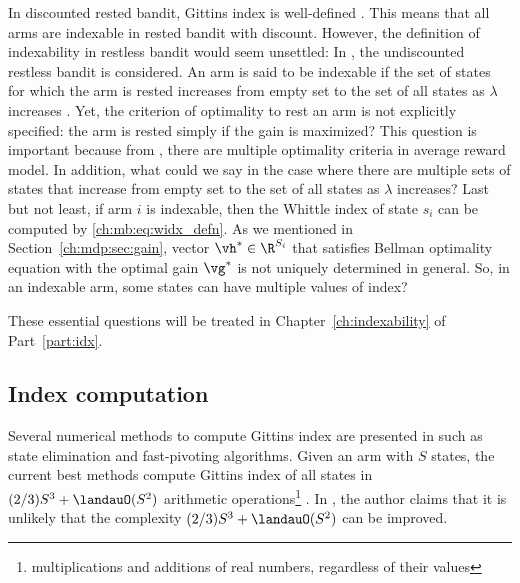 In discounted rested bandit, Gittins index is well-defined \cite{chakravorty2014multi}.
This means that all arms are indexable in rested bandit with discount.
However, the definition of indexability in restless bandit would seem unsettled:
In \cite[Chapter~14]{whittle1996optimal}, the undiscounted restless bandit is considered.
An arm is said to be indexable if the set of states for which the arm is rested increases from empty set to the set of all states as $\lambda$ increases \cite[Page~280]{whittle1996optimal}.
Yet, the criterion of optimality to rest an arm is not explicitly specified: the arm is rested simply if the gain is maximized?
This question is important because from \cite{puterman2014markov}, there are multiple optimality criteria in average reward model.
In addition, what could we say in the case where there are multiple sets of states that increase from empty set to the set of all states as $\lambda$ increases?
Last but not least, if arm $i$ is indexable, then the Whittle index of state $s_i$ can be computed by \eqref{ch:mb:eq:widx_defn}.
As we mentioned in Section~\ref{ch:mdp:sec:gain}, vector $\vh^*\in\R^{S_i}$ that satisfies Bellman optimality equation with the optimal gain $\vg^*$ is not uniquely determined in general.
So, in an indexable arm, some states can have multiple values of index?

These essential questions will be treated in Chapter~\ref{ch:indexability} of Part~\ref{part:idx}.

\subsection{Index computation}

Several numerical methods to compute Gittins index are presented in \cite{chakravorty2014multi} such as state elimination \cite{sonin2008generalized} and fast-pivoting \cite{nino20072} algorithms.
Given an arm with $S$ states, the current best methods compute Gittins index of all states in $(2/3)S^3+\landauO(S^2)$ arithmetic operations\footnote{multiplications and additions of real numbers, regardless of their values} \cite{chakravorty2014multi}.
In \cite[Page~4]{nino2020fast}, the author claims that it is unlikely that the complexity $(2/3)S^3+\landauO(S^2)$ can be improved.

